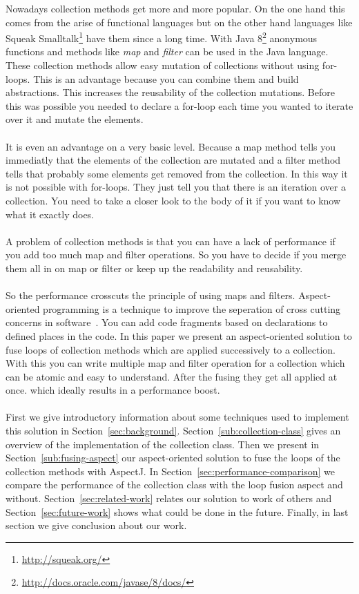 \documentclass[runningheads,a4paper]{llncs}
\begin{document}
Nowadays collection methods get more and more popular.
On the one hand this comes from the arise of functional languages but on the other hand languages like Squeak Smalltalk\footnote{\url{http://squeak.org/}} have them since a long time.
With Java 8\footnote{\url{http://docs.oracle.com/javase/8/docs/}} anonymous functions and methods like \textit{map} and \textit{filter} can be used in the Java language.
These collection methods allow easy mutation of collections without using for-loops.
This is an advantage because you can combine them and build abstractions.
This increases the reusability of the collection mutations. Before this was possible you needed to declare a for-loop each time you wanted to iterate over it and mutate the elements.\\
\\
It is even an advantage on a very basic level.
Because a map method tells you immediatly that the elements of the collection are mutated and a filter method tells that probably some elements get removed from the collection.
In this way it is not possible with for-loops. They just tell you that there is an iteration over a collection. You need to take a closer look to the body of it if you want to know what it exactly does.\\
\\
A problem of collection methods is that you can have a lack of performance if you add too much map and filter operations.
So you have to decide if you merge them all in on map or filter or keep up the readability and reusability.\\
\\
So the performance crosscuts the principle of using maps and filters. Aspect-oriented programming is a technique to improve the seperation of cross cutting concerns in software~\cite{kiczales1997aspect}.
You can add code fragments based on declarations to defined places in the code. In this paper we present an aspect-oriented solution to fuse loops of collection methods which are applied successively to a collection.
With this you can write multiple map and filter operation for a collection which can be atomic and easy to understand. After the fusing they get all applied at once. which ideally results in a performance boost.\\
\\
First we give introductory information about some techniques used to implement this solution in Section~\ref{sec:background}. Section~\ref{sub:collection-class} gives an overview of the implementation of the collection class.
Then we present in Section~\ref{sub:fusing-aspect} our aspect-oriented solution to fuse the loops of the collection methods with AspectJ. In Section~\ref{sec:performance-comparison} we compare the performance of the collection class with the loop fusion aspect and without.
Section~\ref{sec:related-work} relates our solution to work of others and Section~\ref{sec:future-work} shows what could be done in the future. Finally, in last section we give conclusion about our work.
\end{document}
